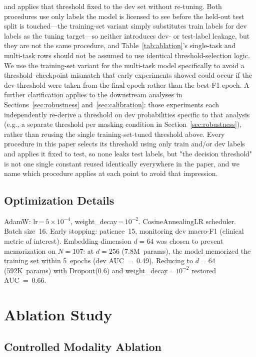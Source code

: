 \documentclass[5p,twocolumn]{elsarticle}
\begin{document}
and applies that threshold fixed to the dev set without re-tuning.
Both procedures use only labels the model is licensed to see before
the held-out test split is touched---the training-set variant simply
substitutes train labels for dev labels as the tuning target---so
neither introduces dev- or test-label leakage, but they are not the
same procedure, and Table~\ref{tab:ablation}'s single-task and
multi-task rows should not be assumed to use identical
threshold-selection logic. We use the training-set variant for the
multi-task model specifically to avoid a threshold–checkpoint
mismatch that early experiments showed could occur if the dev
threshold were taken from the final epoch rather than the best-F1
epoch. A further clarification applies to the downstream analyses in
Sections~\ref{sec:robustness} and~\ref{sec:calibration}: those
experiments each independently re-derive a threshold on dev
probabilities specific to that analysis (e.g., a separate threshold
per masking condition in Section~\ref{sec:robustness}), rather than
reusing the single training-set-tuned threshold above. Every
procedure in this paper selects its threshold using only train and/or
dev labels and applies it fixed to test, so none leaks test labels,
but "the decision threshold" is not one single constant reused
identically everywhere in the paper, and we name which procedure
applies at each point to avoid that impression.

\subsection{Optimization Details}

AdamW: lr\,=\,$5\!\times\!10^{-4}$, weight\_decay\,=\,$10^{-2}$.
CosineAnnealingLR scheduler. Batch size~16. Early stopping:
patience~15, monitoring dev macro-F1 (clinical metric of interest).
Embedding dimension $d=64$ was chosen to prevent memorization on
$N=107$: at $d=256$ (7.8M~params), the model memorized the training
set within 5~epochs (dev AUC~=~0.49). Reducing to $d=64$ (592K~params)
with Dropout(0.6) and weight\_decay\,=\,$10^{-2}$ restored AUC~=~0.66.

\section{Ablation Study}
\label{sec:ablation}

\subsection{Controlled Modality Ablation}
\end{document}
